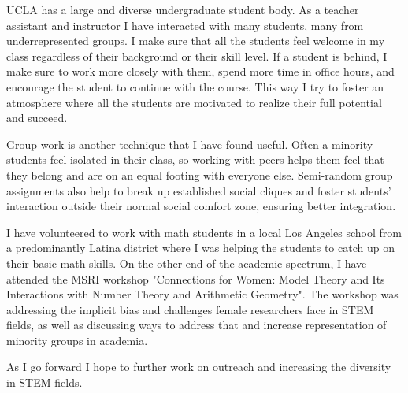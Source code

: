 UCLA has a large and diverse undergraduate student body. As a teacher assistant and instructor I have interacted with many students, many from underrepresented groups. I make sure that all the students feel welcome in my class regardless of their background or their skill level. If a student is behind, I make sure to work more closely with them, spend more time in office hours, and encourage the student to continue with the course. This way I try to foster an atmosphere where all the students are motivated to realize their full potential and succeed.

Group work is another technique that I have found useful. Often a minority students feel isolated in their class, so working with peers helps them feel that they belong and are on an equal footing with everyone else. Semi-random group assignments also help to break up established social cliques and foster students' interaction outside their normal social comfort zone, ensuring better integration.

I have volunteered to work with math students in a local Los Angeles school from a predominantly Latina district where I was helping the students to catch up on their basic math skills. On the other end of the academic spectrum, I have attended the MSRI workshop "Connections for Women: Model Theory and Its Interactions with Number Theory and Arithmetic Geometry". The workshop was addressing the implicit bias and challenges female researchers face in STEM fields, as well as discussing ways to address that and increase representation of minority groups in academia.

As I go forward I hope to further work on outreach and increasing the diversity in STEM fields.
